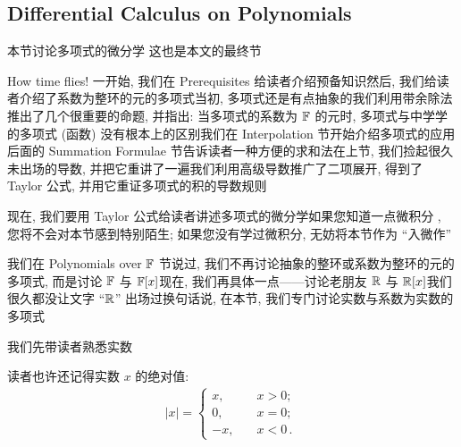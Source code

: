 \subsection*{Differential Calculus on Polynomials}

本节讨论多项式的微分学 \period 这也是本文的最终节\period

How time flies! 一开始, 我们在 Prerequisites 给读者介绍预备知识\period 然后, 我们给读者介绍了系数为整环的元的多项式\period 当初, 多项式还是有点抽象的\period 我们利用带余除法推出了几个很重要的命题, 并指出: 当多项式的系数为 $\mathbb{F}$ 的元时, 多项式与中学学的多项式 (函数) 没有根本上的区别\period 我们在 Interpolation 节开始介绍多项式的应用\period 后面的 Summation Formulae 节告诉读者一种方便的求和法\period 在上节, 我们捡起很久未出场的导数, 并把它重讲了一遍\period 我们利用高级导数推广了二项展开, 得到了 Taylor 公式, 并用它重证多项式的积的导数规则\period

现在, 我们要用 Taylor 公式给读者讲述多项式的微分学\period 如果您知道一点微积分 , 您将不会对本节感到特别陌生; 如果您没有学过微积分, 无妨将本节作为 ``入微作''\period

我们在 Polynomials over $\mathbb{F}$ 节说过, 我们不再讨论抽象的整环或系数为整环的元的多项式, 而是讨论 $\mathbb{F}$ 与 $\mathbb{F}[x]$\period 现在, 我们再具体一点——讨论老朋友 $\mathbb{R}$ 与 $\mathbb{R}[x]$\period 我们很久都没让文字 ``$\mathbb{R}$'' 出场过\period 换句话说, 在本节, 我们专门讨论实数与系数为实数的多项式\period

我们先带读者熟悉实数\period

读者也许还记得实数 $x$ 的绝对值:
\begin{align*}
    |x| = \begin{cases}
        x,  & \quad x > 0;        \\
        0,  & \quad x = 0;        \\
        -x, & \quad x < 0 \period
    \end{cases}
\end{align*}
